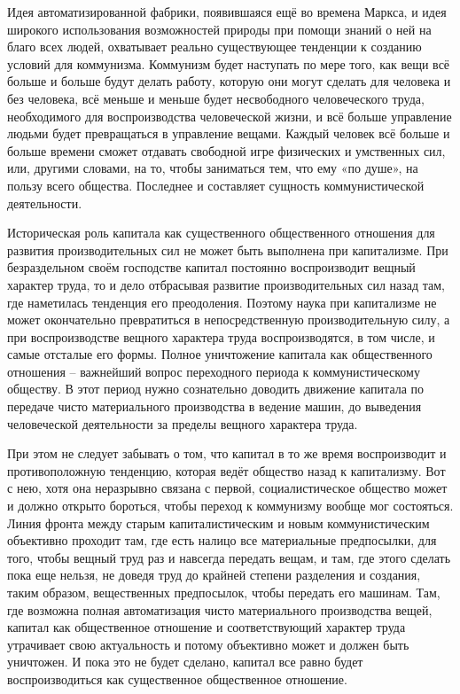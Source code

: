 \documentclass[../main]{subfiles}
\begin{document}
Идея автоматизированной фабрики, появившаяся ещё во времена Маркса, и идея широкого использования возможностей природы при помощи знаний о ней на благо всех людей, охватывает реально существующее тенденции к созданию условий для коммунизма. Коммунизм будет наступать по мере того, как вещи всё больше и больше будут делать работу, которую они могут сделать для человека и без человека, всё меньше и меньше будет несвободного человеческого труда, необходимого для воспроизводства человеческой жизни, и всё больше управление людьми будет превращаться в управление вещами. Каждый человек всё больше и больше времени сможет отдавать свободной игре физических и умственных сил, или, другими словами, на то, чтобы заниматься тем, что ему «по душе», на пользу всего общества. Последнее и составляет сущность коммунистической деятельности.

Историческая роль капитала как существенного общественного отношения для развития производительных сил не может быть выполнена при капитализме. При безраздельном своём господстве капитал постоянно воспроизводит вещный характер труда, то и дело отбрасывая развитие производительных сил назад там, где наметилась тенденция его преодоления. Поэтому наука при капитализме не может окончательно превратиться в непосредственную производительную силу, а при воспроизводстве вещного характера труда воспроизводятся, в том числе, и самые отсталые его формы. Полное уничтожение капитала как общественного отношения – важнейший вопрос переходного периода к коммунистическому обществу. В этот период нужно сознательно доводить движение капитала по передаче чисто материального производства в ведение машин, до выведения человеческой деятельности за пределы вещного характера труда.

При этом не следует забывать о том, что капитал в то же время воспроизводит и противоположную тенденцию, которая ведёт общество назад к капитализму. Вот с нею, хотя она неразрывно связана с первой, социалистическое общество может и должно открыто бороться, чтобы переход к коммунизму вообще мог состояться. Линия фронта между старым капиталистическим и новым коммунистическим объективно проходит там, где есть налицо все материальные предпосылки, для того, чтобы вещный труд раз и навсегда передать вещам, и там, где этого сделать пока еще нельзя, не доведя труд до крайней степени разделения и создания, таким образом, вещественных предпосылок, чтобы передать его машинам. Там, где возможна полная автоматизация чисто материального производства вещей, капитал как общественное отношение и соответствующий характер труда утрачивает свою актуальность и потому объективно может и должен быть уничтожен. И пока это не будет сделано, капитал все равно будет воспроизводиться как существенное общественное отношение.
\end{document}
